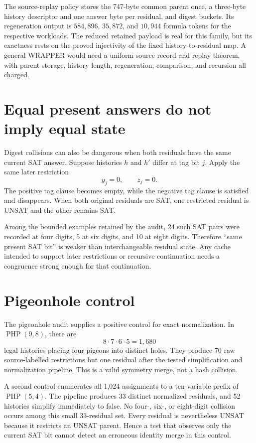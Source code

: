\documentclass[11pt]{article}
\begin{document}
The source-replay policy stores the 747-byte common parent once, a three-byte
history descriptor and one answer byte per residual, and digest buckets.  Its
regeneration output is $584{,}896$, $35{,}872$, and $10{,}944$ formula tokens
for the respective workloads.  The reduced retained payload is real for this
family, but its exactness rests on the proved injectivity of the fixed
history-to-residual map.  A general WRAPPER would need a uniform source record
and replay theorem, with parent storage, history length, regeneration,
comparison, and recursion all charged.

\section{Equal present answers do not imply equal state}

Digest collisions can also be dangerous when both residuals have the same
current SAT answer.  Suppose histories $h$ and $h'$ differ at tag bit $j$.
Apply the same later restriction
\[
 y_j=0,\qquad z_j=0.
 \tag{4}
\]
The positive tag clause becomes empty, while the negative tag clause is
satisfied and disappears.  When both original residuals are SAT, one
restricted residual is UNSAT and the other remains SAT.

Among the bounded examples retained by the audit, 24 such SAT pairs were
recorded at four digits, 5 at six digits, and 10 at eight digits.  Therefore
``same present SAT bit'' is weaker than interchangeable residual state.  Any
cache intended to support later restrictions or recursive continuation needs
a congruence strong enough for that continuation.

\section{Pigeonhole control}

The pigeonhole audit supplies a positive control for exact normalization.  In
$\operatorname{PHP}(9,8)$, there are
\[
 8\cdot7\cdot6\cdot5=1{,}680
\]
legal histories placing four pigeons into distinct holes.  They produce 70
raw source-labelled restrictions but one residual after the tested
simplification and normalization pipeline.  This is a valid symmetry merge,
not a hash collision.

A second control enumerates all 1,024 assignments to a ten-variable prefix of
$\operatorname{PHP}(5,4)$.  The pipeline produces 33 distinct normalized
residuals, and 52 histories simplify immediately to false.  No four-, six-,
or eight-digit collision occurs among this small 33-residual set.  Every
residual is nevertheless UNSAT because it restricts an UNSAT parent.  Hence a
test that observes only the current SAT bit cannot detect an erroneous
identity merge in this control.
\end{document}

